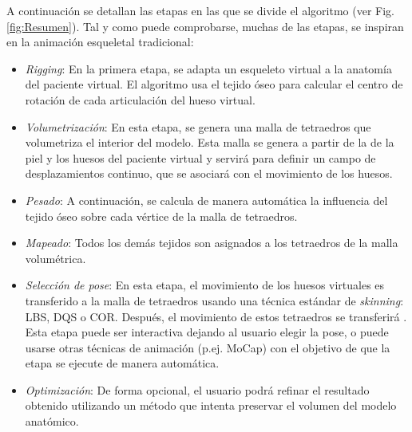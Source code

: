 A continuación se detallan las etapas en las que se divide el algoritmo (ver Fig. \ref{fig:Resumen}). Tal y como puede comprobarse, muchas de las etapas, se inspiran en la animación esqueletal tradicional:
\begin{itemize}

	\item \emph{Rigging}: %
	En la primera etapa, se adapta un esqueleto virtual a la anatomía del paciente virtual. El algoritmo usa el tejido óseo para calcular el centro de rotación de cada articulación del hueso virtual.
	
     \item \emph{Volumetrización}: En esta etapa, se genera una malla de tetraedros que volumetriza el interior del modelo. Esta malla se genera a partir de la de la piel y los huesos del paciente virtual y servirá para definir un campo de desplazamientos continuo, que se asociará con el movimiento de los huesos.

    \item \emph{Pesado}: A continuación, se calcula de manera automática la influencia del tejido óseo sobre cada vértice de la malla de tetraedros. 
    
    \item \emph{Mapeado}: Todos los demás tejidos son asignados a los tetraedros de la malla volumétrica. 

    \item \emph{Selección de pose}: En esta etapa, el movimiento de los huesos virtuales es transferido a la malla de tetraedros usando una técnica estándar de \emph{skinning}: \ac{LBS}, \ac{DQS} o \ac{COR}. 
    Después, el movimiento de estos tetraedros se transferirá  . Esta etapa puede ser interactiva dejando al usuario elegir la pose, o puede usarse otras técnicas de animación (p.ej. \ac{MoCap}) con el objetivo de que la etapa se ejecute de manera automática.%

    \item \emph{Optimización}: De forma opcional, el usuario podrá refinar el resultado obtenido utilizando un método que intenta preservar el volumen del modelo anatómico.
\end{itemize}

